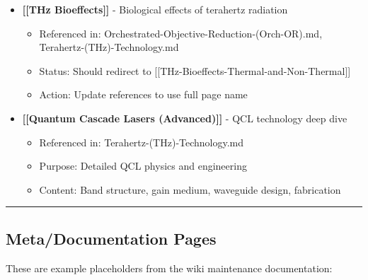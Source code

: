 \begin{itemize}
\tightlist
\item
  \textbf{{[}{[}THz Bioeffects{]}{]}} - Biological effects of terahertz
  radiation

  \begin{itemize}
  \tightlist
  \item
    Referenced in: Orchestrated-Objective-Reduction-(Orch-OR).md,
    Terahertz-(THz)-Technology.md
  \item
    Status: Should redirect to
    {[}{[}THz-Bioeffects-Thermal-and-Non-Thermal{]}{]}
  \item
    Action: Update references to use full page name
  \end{itemize}
\item
  \textbf{{[}{[}Quantum Cascade Lasers (Advanced){]}{]}} - QCL
  technology deep dive

  \begin{itemize}
  \tightlist
  \item
    Referenced in: Terahertz-(THz)-Technology.md
  \item
    Purpose: Detailed QCL physics and engineering
  \item
    Content: Band structure, gain medium, waveguide design, fabrication
  \end{itemize}
\end{itemize}

\begin{center}\rule{0.5\linewidth}{0.5pt}\end{center}

\subsection{\texorpdfstring{ Meta/Documentation
Pages}{ Meta/Documentation Pages}}\label{metadocumentation-pages}

These are example placeholders from the wiki maintenance documentation:

